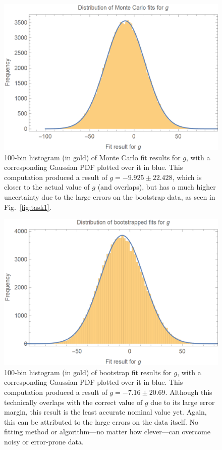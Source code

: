 \documentclass{article}
\begin{document}
\begin{figure}[H]
    \centering
    \includegraphics[width=4.5in]{homework7/task2hist.png}
    \caption{100-bin histogram (in gold) of Monte Carlo fit results for $g$, with a corresponding Gaussian PDF plotted over it in blue. This computation produced a result of $g=-9.925\pm22.428$, which is closer to the actual value of $g$ (and overlaps), but has a much higher uncertainty due to the large errors on the bootstrap data, as seen in Fig.~\ref{fig:task1}.}
    \label{fig:task2}
\end{figure}

\begin{figure}[H]
    \centering
    \includegraphics[width=4.5in]{homework7/task3hist.png}
    \caption{100-bin histogram (in gold) of bootstrap fit results for $g$, with a corresponding Gaussian PDF plotted over it in blue. This computation produced a result of $g=-7.16\pm20.69$. Although this technically overlaps with the correct value of $g$ due to its large error margin, this result is the least accurate nominal value yet. Again, this can be attributed to the large errors on the data itself. No fitting method or algorithm---no matter how clever---can overcome noisy or error-prone data.}
    \label{fig:task3}
\end{figure}
\end{document}

